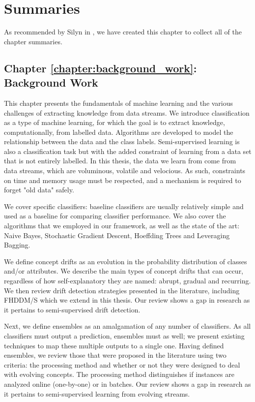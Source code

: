 \chapter{Summaries}
As recommended by Silyn in \cite[p.~151]{silyn2012writing}, we have created this chapter to collect all of the chapter summaries.


\section{Chapter \ref{chapter:background_work}: Background Work}
This chapter presents the fundamentals of machine learning and the various challenges of extracting knowledge from data streams. We introduce classification as a type of machine learning, for which the goal is to extract knowledge, computationally, from labelled data. Algorithms are developed to model the relationship between the data and the class labels. Semi-supervised learning is also a classification task but with the added constraint of learning from a data set that is not entirely labelled. In this thesis, the data we learn from come from data streams, which are voluminous, volatile and velocious. As such, constraints on time and memory usage must be respected, and a mechanism is required to forget "old data" safely.

We cover specific classifiers: baseline classifiers are usually relatively simple and used as a baseline for comparing classifier performance. We also cover the algorithms that we employed in our framework, as well as the state of the art: Naive Bayes, Stochastic Gradient Descent, Hoeffding Trees and Leveraging Bagging.

We define concept drifts as an evolution in the probability distribution of classes and/or attributes. We describe the main types of concept drifts that can occur, regardless of how self-explanatory they are named: abrupt, gradual and recurring. We then review drift detection strategies presented in the literature, including FHDDM/S which we extend in this thesis. Our review shows a gap in research as it pertains to semi-supervised drift detection.

Next, we define ensembles as an amalgamation of any number of classifiers. As all classifiers must output a prediction, ensembles must as well; we present existing techniques to map these multiple outputs to a single one. Having defined ensembles, we review those that were proposed in the literature using two criteria: the processing method and whether or not they were designed to deal with evolving concepts. The processing method distinguishes if instances are analyzed online (one-by-one) or in batches. Our review shows a gap in research as it pertains to semi-supervised learning from evolving streams.

